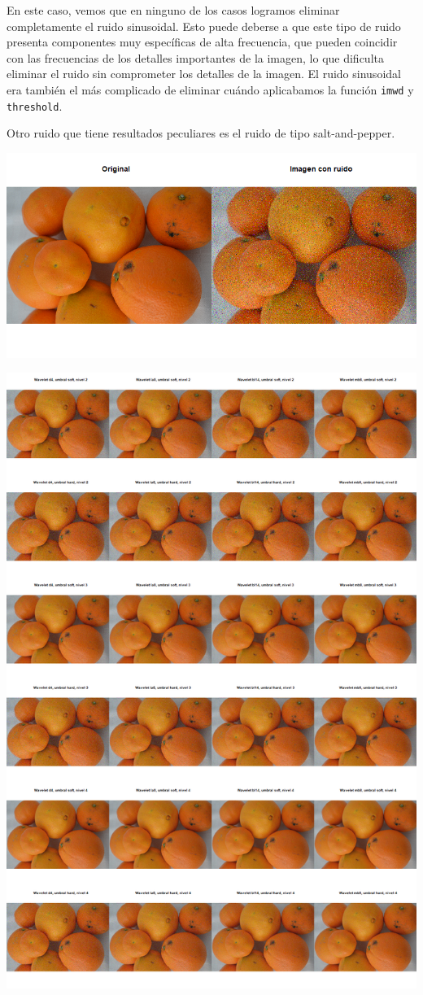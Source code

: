 \documentclass[
]{article}
\begin{document}
En este caso, vemos que en ninguno de los casos logramos eliminar
completamente el ruido sinusoidal. Esto puede deberse a que este tipo de
ruido presenta componentes muy específicas de alta frecuencia, que
pueden coincidir con las frecuencias de los detalles importantes de la
imagen, lo que dificulta eliminar el ruido sin comprometer los detalles
de la imagen. El ruido sinusoidal era también el más complicado de
eliminar cuándo aplicabamos la función \texttt{imwd} y
\texttt{threshold}.

Otro ruido que tiene resultados peculiares es el ruido de tipo
salt-and-pepper.

\begin{center}\includegraphics[width=0.5\linewidth,height=0.5\textheight]{denoisedwt2d/pepper} \end{center}

\begin{center}\includegraphics[width=1\linewidth]{denoisedwt2d/pepper_denoised} \end{center}
\end{document}
